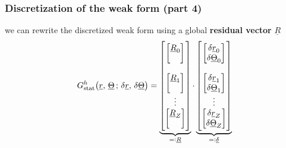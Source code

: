 \begin{frame}
  \frametitle{Discretization of the weak form (part 4)}

  we can rewrite the discretized weak form using a global \textbf{residual vector} $\underline{R}$
  \begin{displaymath}
    G_{\text{stat}}^h \bigl( \underline{r}, \, \underline{\Theta} \, ; \, \delta \underline{r}, \, \delta \underline{\Theta} \bigr) =
    \underbrace{
    \begin{bmatrix}
      \begin{bmatrix}
        \underline{R}_0 \\
        \null 
      \end{bmatrix}
      \\ \\
      \begin{bmatrix}
        \underline{R}_1 \\
        \null
      \end{bmatrix}
      \\
      \vdots
      \\
      \begin{bmatrix}
        \underline{R}_Z \\
        \null
      \end{bmatrix}
    \end{bmatrix}
    }_{=: \underline{R}}
    \cdot
    \underbrace{
    \begin{bmatrix}
      \begin{bmatrix}
        \delta \underline{r}_0 \\
        \delta \underline{\Theta}_0
      \end{bmatrix}
      \\ \\
      \begin{bmatrix}
        \delta \underline{r}_1 \\
        \delta \underline{\Theta}_1
      \end{bmatrix}
      \\
      \vdots
      \\
      \begin{bmatrix}
        \delta \underline{r}_Z \\
        \delta \underline{\Theta}_Z
      \end{bmatrix}
    \end{bmatrix}
    }_{=: \underline{\delta}}
    \label{eq:deltaVector}
  \end{displaymath}
  

\end{frame}
